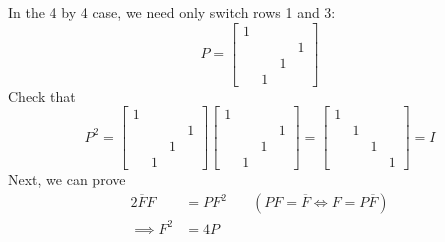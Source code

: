 \documentclass[a4paper]{article}
\begin{document}
In the 4 by 4 case, we need only switch rows 1 and 3:
\[
	P = \begin{bmatrix}
		1 &  &  & \\
		 &  & & 1 \\
		 &  & 1 & \\
		 & 1 &  &
	\end{bmatrix} 
\]
Check that
\[
	P^{2} = \begin{bmatrix}
		1 &  &  & \\
		 &  &  & 1 \\
		 &  & 1 & \\
		 & 1 &  & 
	\end{bmatrix} 
	\begin{bmatrix}
		1 &  &  & \\
		 &  &  & 1 \\
		 &  & 1 & \\
		 & 1 &  & 
	\end{bmatrix}
	= \begin{bmatrix}
		1 &  &  & \\
		 & 1 &  & \\
		 &  & 1 & \\
		 &  &  & 1 
	\end{bmatrix}
	= I
\]
Next, we can prove
\begin{alignat*}{2}
	\overline{F}F & = PF^{2} & \quad \!\left( PF = \overline{F} \iff F = P \overline{F} \right)\\
	\implies F^{2} & = 4P & 
\end{alignat*}

\end{document}
